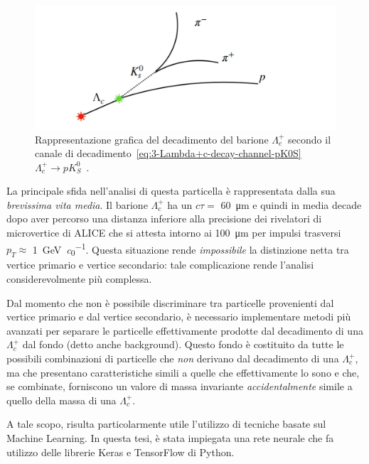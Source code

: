 \begin{figure}[t]
    \centering
    \includegraphics[width=1\linewidth]{res/fig/3-chapter/1-Lambda+c-decay.jpg}
    \caption{Rappresentazione grafica del decadimento del barione $\Lambda_{c}^{+}$ secondo il canale di decadimento~\ref{eq:3-Lambda+c-decay-channel-pK0S} $\Lambda_{c}^{+} \to p K^{0}_{S}$~\cite{Fusconi_2022}.}
    \label{fig:3-1-Lambda+c-decay}
\end{figure}

La principale sfida nell’analisi di questa particella è rappresentata dalla sua \textit{brevissima vita media}. Il barione $\Lambda_{c}^{+}$ ha un $c \tau =$ \qty{60}{\micro \meter} e quindi in media decade dopo aver percorso una distanza inferiore alla precisione dei rivelatori di microvertice di ALICE che si attesta intorno ai \qty{100}{\micro \meter} per impulsi trasversi $p_{T} \approx$ \qty{1}{\giga \eV \per \clight}. Questa situazione rende \textit{impossibile} la distinzione netta tra vertice primario e vertice secondario: tale complicazione rende l’analisi considerevolmente più complessa.

Dal momento che non è possibile discriminare tra particelle provenienti dal vertice primario e dal vertice secondario, è necessario implementare metodi più avanzati per separare le particelle effettivamente prodotte dal decadimento di una $\Lambda_{c}^{+}$ dal fondo (detto anche background). Questo fondo è costituito da tutte le possibili combinazioni di particelle che \textit{non} derivano dal decadimento di una $\Lambda_{c}^{+}$, ma che presentano caratteristiche simili a quelle che effettivamente lo sono e che, se combinate, forniscono un valore di massa invariante \textit{accidentalmente} simile a quello della massa di una $\Lambda_{c}^{+}$.

A tale scopo, risulta particolarmente utile l’utilizzo di tecniche basate sul Machine Learning. In questa tesi, è stata impiegata una rete neurale che fa utilizzo delle librerie Keras e TensorFlow di Python.


